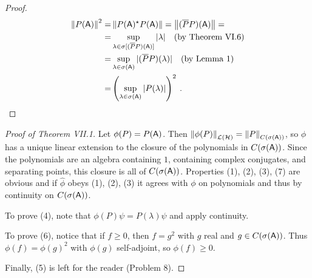 \begin{proof}
    \begin{align}
        \left \Vert P(\mathsf{A}) \right \Vert^2 =& \left \Vert P(\mathsf{A})^\star P(\mathsf{A}) \right \Vert = \left \Vert (\overline{P} P)(\mathsf{A}) \right \Vert 
        = \\
        =& \sup_{\lambda \in \sigma [(\overline{P} P)(\mathsf{A})]} |\lambda| \quad \text{(by Theorem VI.6)} \nonumber \\
        =& \sup_{\lambda \in \sigma(\mathsf{A})} |(\overline{P} P)(\lambda)| \quad \text{(by Lemma 1)}  \nonumber \\
        =& \left( \sup_{\lambda \in \sigma(\mathsf{A})} |P(\lambda)| \right)^2 \:. \nonumber
    \end{align}
\end{proof}

\begin{proof}[Proof of Theorem VII.1]
    Let $\phi(P) = P(\mathsf{A})$. Then $ \left \Vert \phi(P) \right \Vert_{\mathcal L(\mathcal{H})} = \left \Vert P \right \Vert_{C(\sigma(\mathsf{A}))} $, so $\phi$ has a unique linear extension to the closure of the polynomials in $C(\sigma(\mathsf{A}))$. Since the polynomials are an algebra containing $1$, containing complex conjugates, and separating points, this closure is all of $C(\sigma(\mathsf{A}))$. Properties (1), (2), (3), (7) are obvious and if $\hat \phi$ obeys (1), (2), (3) it agrees with $\phi$ on polynomials and thus by continuity on $C(\sigma(\mathsf{A}))$. 
    
    To prove (4), note that $\phi(P)\psi = P(\lambda) \psi$ and apply continuity. 
    
    To prove (6), notice that if $f \geq 0$, then $f = g^2$ with $g$ real and $g \in C(\sigma( \mathsf{A}))$. Thus $\phi(f) = \phi(g)^2$ with $\phi(g)$ self-adjoint, so $\phi(f) \geq 0$.

    Finally, (5) is left for the reader (Problem 8).
    
\end{proof}

